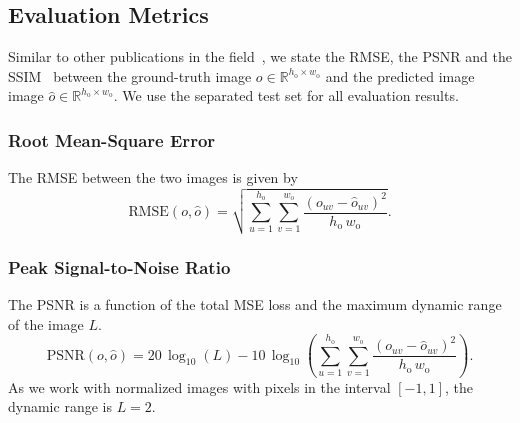 \subsection{Evaluation Metrics}
Similar to other publications in the field~\citep{liu2018image, yu2018generative, stolzle2022reconstructing}, %
we state the \gls{RMSE}, the \gls{PSNR} and the \gls{SSIM}~\citep{wang2004image} between the ground-truth image $o \in \mathbb{R}^{h_\mathrm{o} \times w_\mathrm{o}}$ and the predicted image image $\hat{o} \in \mathbb{R}^{h_\mathrm{o} \times w_\mathrm{o}}$.
We use the separated test set for all evaluation results.

\subsubsection{Root Mean-Square Error}
The \gls{RMSE} between the two images is given by
\begin{equation}
    \text{RMSE}(o, \hat{o}) = \sqrt{\sum_{u = 1}^{h_\mathrm{o}} \sum_{v = 1}^{w_\mathrm{o}} \frac{(o_{uv} - \hat{o}_{uv})^2}{h_\mathrm{o} \, w_\mathrm{o}}}.
\end{equation}

\subsubsection{Peak Signal-to-Noise Ratio}
The \gls{PSNR} is a function of the total \gls{MSE} loss and the maximum dynamic range of the image $L$. 
\begin{equation}
    \mathrm{PSNR}(o, \hat{o}) = 20 \, \log_{10} (L) - 10 \, \log_{10} \left (\sum_{u = 1}^{h_\mathrm{o}} \sum_{v = 1}^{w_\mathrm{o}} \frac{(o_{uv} - \hat{o}_{uv})^2}{h_\mathrm{o} \, w_\mathrm{o}} \right ).
\end{equation}
As we work with normalized images with pixels in the interval $[-1, 1]$, the dynamic range is $L = 2$.

